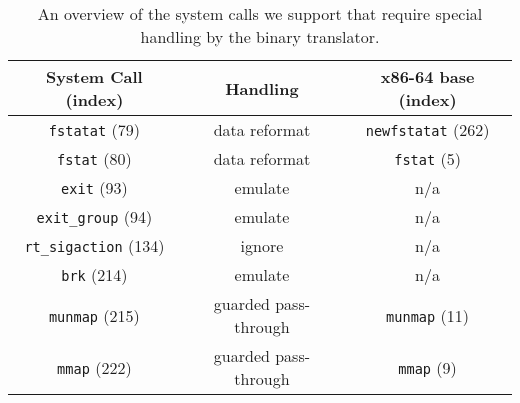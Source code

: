 \begin{table}
	\centering
	\begin{tabular}{ccc}
		\toprule
		\textbf{System Call (index)} & \textbf{Handling} & \textbf{x86-64 base (index)}\\ 
		\midrule
		\texttt{fstatat} (79) & data reformat & \texttt{newfstatat} (262)\\
		\texttt{fstat} (80) & data reformat & \texttt{fstat} (5)\\
		\texttt{exit} (93) & emulate & n/a\\
		\texttt{exit\_group} (94) & emulate & n/a\\
		\texttt{rt\_sigaction} (134) & ignore & n/a\\
		\texttt{brk} (214) & emulate & n/a\\
		\texttt{munmap} (215) & guarded pass-through & \texttt{munmap} (11)\\
		\texttt{mmap} (222) & guarded pass-through & \texttt{mmap} (9)\\
		\bottomrule
	\end{tabular}
	\caption[Specially handled system calls overview]%
	{An overview of the system calls we support that require special handling by the binary translator.}
	\label{tab:syscall-special}
\end{table}




